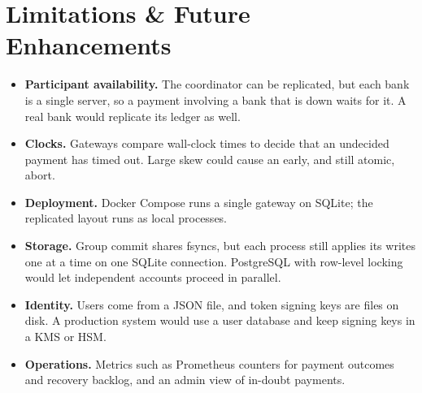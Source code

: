 \documentclass[11pt]{article}
\begin{document}
\section{Limitations \& Future Enhancements}
\begin{itemize}
  \item \textbf{Participant availability.} The coordinator can be
        replicated, but each bank is a single server, so a payment involving a
        bank that is down waits for it. A real bank would replicate its ledger
        as well.
  \item \textbf{Clocks.} Gateways compare wall-clock times to decide that an
        undecided payment has timed out. Large skew could cause an early, and
        still atomic, abort.
  \item \textbf{Deployment.} Docker Compose runs a single gateway on SQLite;
        the replicated layout runs as local processes.
  \item \textbf{Storage.} Group commit shares fsyncs, but each process still
        applies its writes one at a time on one SQLite connection. PostgreSQL
        with row-level locking would let independent accounts proceed in
        parallel.
  \item \textbf{Identity.} Users come from a JSON file, and token signing
        keys are files on disk. A production system would use a user database
        and keep signing keys in a KMS or HSM.
  \item \textbf{Operations.} Metrics such as Prometheus counters for payment
        outcomes and recovery backlog, and an admin view of in-doubt payments.
\end{itemize}
\end{document}
